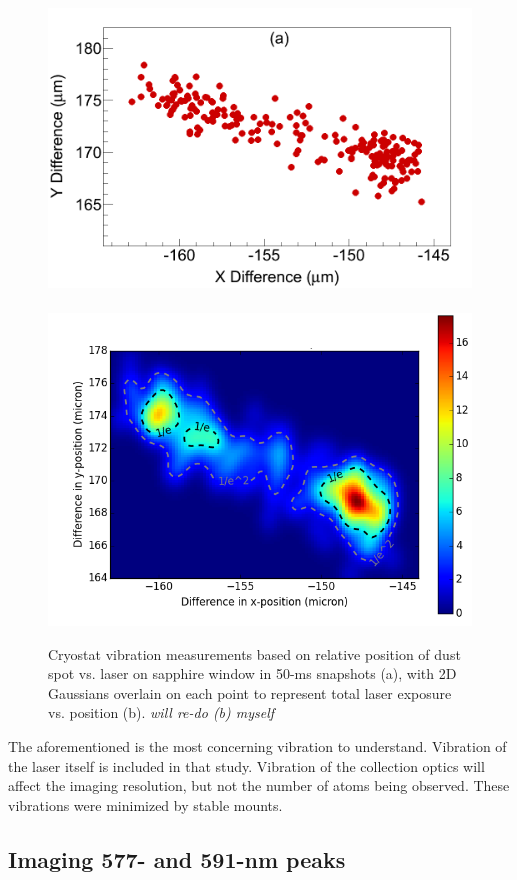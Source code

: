 \begin{figure} %
        \centering
                \includegraphics[width=.5\textwidth]{figures/cryovibes_a.png}
                ~
                \includegraphics[width=.5\textwidth]{figures/cryovibes_b_chris_run10_15_diff_func_wcontour.png}
                \caption{Cryostat vibration measurements based on relative position of dust spot vs. laser on sapphire window in 50-ms snapshots (a), with 2D Gaussians overlain on each point to represent total laser exposure vs. position (b). \emph{\color{red}will re-do (b) myself}}
\label{fig:cryovibe2D}
\end{figure}

The aforementioned is the most concerning vibration to understand.  Vibration of the laser itself is included in that study.  Vibration of the collection optics will affect the imaging resolution, but not the number of atoms being observed.  These vibrations were minimized by stable mounts.

\subsection{Imaging 577- and 591-nm peaks}
\label{subsec:imaging590and577}

